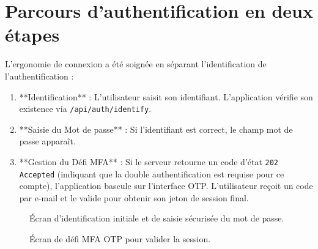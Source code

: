 \documentclass[11pt,a4paper,oneside]{report}
\newcommand{\code}[1]{\texttt{\small #1}}
\begin{document}
\section{Parcours d'authentification en deux étapes}
L'ergonomie de connexion a été soignée en séparant l'identification de l'authentification :
\begin{enumerate}
  \item **Identification** : L'utilisateur saisit son identifiant. L'application vérifie son existence via \code{/api/auth/identify}.
  \item **Saisie du Mot de passe** : Si l'identifiant est correct, le champ mot de passe apparaît. 
  \item **Gestion du Défi MFA** : Si le serveur retourne un code d'état \code{202 Accepted} (indiquant que la double authentification est requise pour ce compte), l'application bascule sur l'interface OTP. L'utilisateur reçoit un code par e-mail et le valide pour obtenir son jeton de session final.
\end{enumerate}

\begin{figure}[h]
  \centering
  \caption{Écran d'identification initiale et de saisie sécurisée du mot de passe.}
  \label{fig:poc-login-steps}
\end{figure}

\begin{figure}[h]
  \centering
  \caption{Écran de défi MFA OTP pour valider la session.}
  \label{fig:poc-login-mfa}
\end{figure}
\end{document}
